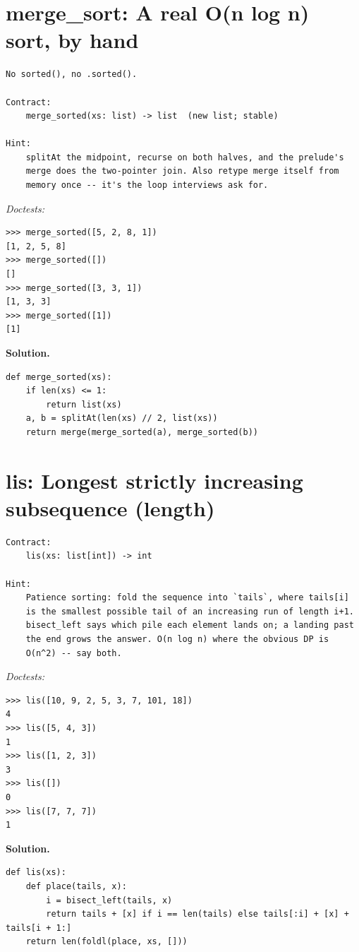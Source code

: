 \documentclass[11pt,letterpaper]{book}
\begin{document}
\section{merge\_sort: A real O(n log n) sort, by hand}
\begin{lstlisting}[style=spec]
No sorted(), no .sorted().

Contract:
    merge_sorted(xs: list) -> list  (new list; stable)

Hint:
    splitAt the midpoint, recurse on both halves, and the prelude's
    merge does the two-pointer join. Also retype merge itself from
    memory once -- it's the loop interviews ask for.
\end{lstlisting}
\noindent\textit{Doctests:}
\begin{lstlisting}[style=spec]
>>> merge_sorted([5, 2, 8, 1])
[1, 2, 5, 8]
>>> merge_sorted([])
[]
>>> merge_sorted([3, 3, 1])
[1, 3, 3]
>>> merge_sorted([1])
[1]
\end{lstlisting}
\noindent\textbf{Solution.}
\begin{lstlisting}[style=code]
def merge_sorted(xs):
    if len(xs) <= 1:
        return list(xs)
    a, b = splitAt(len(xs) // 2, list(xs))
    return merge(merge_sorted(a), merge_sorted(b))
\end{lstlisting}

\section{lis: Longest strictly increasing subsequence (length)}
\begin{lstlisting}[style=spec]
Contract:
    lis(xs: list[int]) -> int

Hint:
    Patience sorting: fold the sequence into `tails`, where tails[i]
    is the smallest possible tail of an increasing run of length i+1.
    bisect_left says which pile each element lands on; a landing past
    the end grows the answer. O(n log n) where the obvious DP is
    O(n^2) -- say both.
\end{lstlisting}
\noindent\textit{Doctests:}
\begin{lstlisting}[style=spec]
>>> lis([10, 9, 2, 5, 3, 7, 101, 18])
4
>>> lis([5, 4, 3])
1
>>> lis([1, 2, 3])
3
>>> lis([])
0
>>> lis([7, 7, 7])
1
\end{lstlisting}
\noindent\textbf{Solution.}
\begin{lstlisting}[style=code]
def lis(xs):
    def place(tails, x):
        i = bisect_left(tails, x)
        return tails + [x] if i == len(tails) else tails[:i] + [x] + tails[i + 1:]
    return len(foldl(place, xs, []))
\end{lstlisting}
\end{document}
